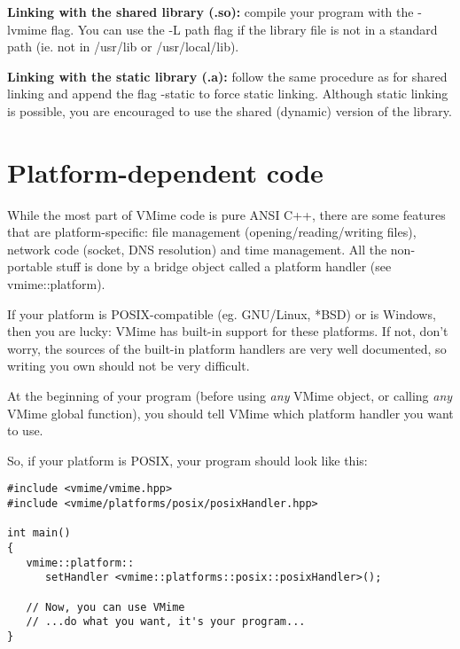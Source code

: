 {\bf Linking with the shared library (.so):} compile your program with the
{\vcode -lvmime} flag. You can use the -L path flag if the library file is
not in a standard path (ie. not in /usr/lib or /usr/local/lib).


{\bf Linking with the static library (.a):} follow the same procedure as for
shared linking and append the flag -static to force static linking. Although
static linking is possible, you are encouraged to use the shared (dynamic)
version of the library.


\section{Platform-dependent code}

While the most part of VMime code is pure ANSI C++, there are some features
that are platform-specific: file management (opening/reading/writing files),
network code (socket, DNS resolution) and time management. All the
non-portable stuff is done by a bridge object called a platform handler (see
{\vcode vmime::platform}).

If your platform is POSIX-compatible (eg. GNU/Linux, *BSD) or is Windows,
then you are lucky: VMime has built-in support for these platforms. If not,
don't worry, the sources of the built-in platform handlers are very well
documented, so writing you own should not be very difficult.

At the beginning of your program (before using \emph{any} VMime object, or
calling \emph{any} VMime global function), you should tell VMime which
platform handler you want to use.

So, if your platform is POSIX, your program should look like this:

\begin{lstlisting}[caption={Initializing VMime and the platform handler}]
#include <vmime/vmime.hpp>
#include <vmime/platforms/posix/posixHandler.hpp>

int main()
{
   vmime::platform::
      setHandler <vmime::platforms::posix::posixHandler>();

   // Now, you can use VMime
   // ...do what you want, it's your program...
}
\end{lstlisting}

